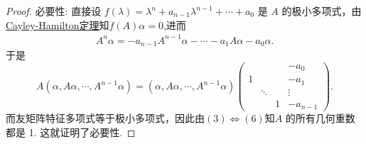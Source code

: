 \documentclass[../../main.tex]{subfiles}
\begin{document}
\begin{proof}
{\heiti 必要性:} 直接设 \( f(\lambda) = \lambda^n + a_{n - 1}\lambda^{n - 1} + \cdots + a_0 \) 是 \( A \) 的极小多项式，由\hyperref[theorem:Cayley-Hamilton定理]{Cayley-Hamilton定理}知$f(A)\alpha =0$,进而
\begin{align*}
A^n\alpha = -a_{n-1}A^{n-1}\alpha-\cdots-a_1A\alpha-a_0\alpha.
\end{align*}
于是
\[
A(\alpha, A\alpha, \cdots, A^{n - 1}\alpha) = (\alpha, A\alpha, \cdots, A^{n - 1}\alpha) \begin{pmatrix}
& & & -a_0 \\
1 & & & -a_1 \\
& \ddots & & \vdots \\
& & 1 & -a_{n - 1}
\end{pmatrix}.
\]
而友矩阵特征多项式等于极小多项式，因此由\((3)\Leftrightarrow(6)\)知\( A \) 的所有几何重数都是 1. 这就证明了必要性.
\end{proof}
\end{document}
